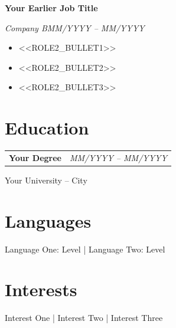 \documentclass[10.5pt]{article}
\newcommand{\jobentry}[3]{%
  \par\vspace{2.5pt}
  \noindent
  {\bfseries\fontsize{10.5}{12}\selectfont #1}\par
  {\itshape\color{gray}\small #2}\hfill{\itshape\color{gray}\small #3}\par\vspace{0.5pt}
}
\begin{document}
\jobentry{Your Earlier Job Title}{Company B}{MM/YYYY -- MM/YYYY}
\begin{itemize}
  \item <<ROLE2_BULLET1>>
  \item <<ROLE2_BULLET2>>
  \item <<ROLE2_BULLET3>>
\end{itemize}

\section{Education}
\begin{tabularx}{\linewidth}{@{}X r@{}}
  \textbf{Your Degree} & {\itshape\color{gray}\small MM/YYYY -- MM/YYYY} \\
\end{tabularx}
{\small Your University -- City}

\section{Languages}
\begingroup\centering\small
Language One: Level \;|\; Language Two: Level\par
\endgroup

\section{Interests}
\begingroup\centering\small
Interest One \;|\; Interest Two \;|\; Interest Three\par
\endgroup
\end{document}
